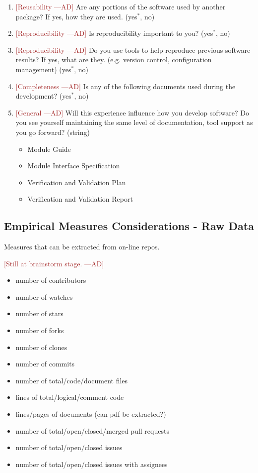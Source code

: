 \documentclass[letterpaper,cleveref]{lipics-v2019}
\newcommand{\authornote}[3]{\textcolor{#1}{[#3 ---#2]}}
\newcommand{\authornote}[3]{}
\newcommand{\ad}[1]{\authornote{brown}{AD}{#1}} %
\theoremstyle{definition}
\begin{document}
\begin{enumerate}
\item \ad{Reusability} Are any portions of the software used by another package? If yes, how they are used. ({yes$^*$, no})
\item \ad{Reproducibility} Is reproducibility important to you? ({yes$^*$, no})
\item \ad{Reproducibility} Do you use tools to help reproduce previous software results? If yes, what are they. (e.g. version control, configuration management) ({yes$^*$, no})
\item \ad{Completeness} Is any of the following documents used during the development? ({yes$^*$, no})
\item \ad{General} Will this experience influence how you develop software? Do you see yourself maintaining the same level of documentation, tool support as you go forward? (string)
\begin{itemize}
\item Module Guide
\item Module Interface Specification
\item Verification and Validation Plan
\item Verification and Validation Report
\end{itemize}
\end{enumerate}

\subsection{Empirical Measures Considerations - Raw Data}

Measures that can be extracted from on-line repos.

\ad{Still at brainstorm stage.}
\begin{itemize}
	\item number of contributors
	\item number of watches
	\item number of stars
	\item number of forks
	\item number of clones
	\item number of commits
	\item number of total/code/document files
	\item lines of total/logical/comment code
	\item lines/pages of documents (can pdf be extracted?)
	\item number of total/open/closed/merged pull requests
	\item number of total/open/closed issues
	\item number of total/open/closed issues with assignees
\end{itemize}
\end{document}
